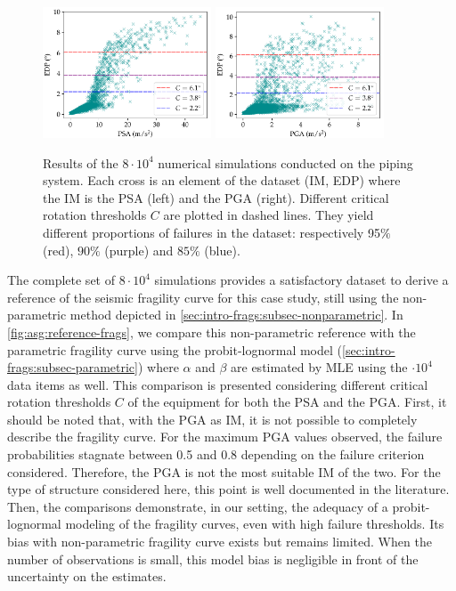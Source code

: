     \begin{figure}[h]
        \centering%
        \includegraphics[width=5cm]{figures/intro-frags/asg/cloud_PSA_light.pdf}%
        \includegraphics[width=5cm]{figures/intro-frags/asg/cloud_PGA_light.pdf}%
        \caption{Results of the $8\cdot10^4$ numerical simulations conducted on the piping system. Each cross is an element of the dataset (IM, EDP) where the IM is the PSA (left) and the PGA (right). Different critical rotation thresholds $C$ are plotted in dashed lines. They yield different proportions of failures in the dataset: respectively 95$\%$ (red), $90\%$ (purple) and $85\%$ (blue).}
        \label{fig:asg:scattersIMs}
        \end{figure}
    
    The complete set of $8\cdot 10^4$ simulations provides a satisfactory dataset to derive a reference of the seismic fragility curve for this case study, still using the non-parametric method depicted in \cref{sec:intro-frags:subsec-nonparametric}.
    In \cref{fig:asg:reference-frags}, we compare this non-parametric reference with the parametric fragility curve using the probit-lognormal model (\cref{sec:intro-frags:subsec-parametric}) where $\alpha$ and $\beta$ are estimated by MLE using the $\cdot 10^4$ data items as well. {This comparison is presented considering different critical rotation thresholds $ C $ of the equipment for both the PSA and the PGA. First, it should be noted that, with the PGA as IM, it is not possible to completely describe the fragility curve. For the maximum PGA values observed, the failure probabilities stagnate between 0.5 and 0.8 depending on the failure criterion considered. Therefore, the PGA is not the most suitable IM of the two. For the type of structure considered here, this point is well documented in the literature. Then, the comparisons demonstrate, in our setting, the adequacy of a probit-lognormal modeling of the fragility curves, even with high failure thresholds.} Its bias with non-parametric fragility curve exists but remains limited. When the number of observations is small, this model bias is negligible in front of the uncertainty on the estimates.


